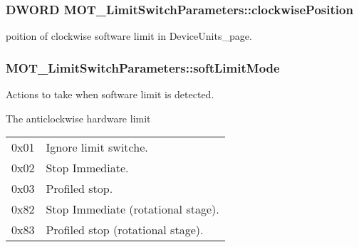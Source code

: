 \subsubsection[{\texorpdfstring{clockwise\+Position}{clockwisePosition}}]{\setlength{\rightskip}{0pt plus 5cm}D\+W\+O\+RD M\+O\+T\+\_\+\+Limit\+Switch\+Parameters\+::clockwise\+Position}\hypertarget{struct_m_o_t___limit_switch_parameters_a391960e2ffe9ba412627311342e12fbd}{}\label{struct_m_o_t___limit_switch_parameters_a391960e2ffe9ba412627311342e12fbd}


poition of clockwise software limit in Device\+Units\+\_\+page. 

\subsubsection[{\texorpdfstring{soft\+Limit\+Mode}{softLimitMode}}]{ M\+O\+T\+\_\+\+Limit\+Switch\+Parameters\+::soft\+Limit\+Mode}\hypertarget{struct_m_o_t___limit_switch_parameters_a6f99c8d8e7f41502b437867caf046c5d}{}\label{struct_m_o_t___limit_switch_parameters_a6f99c8d8e7f41502b437867caf046c5d}


Actions to take when software limit is detected. 

The anticlockwise hardware limit \tabulinesep=1mm
\begin{longtabu} spread 0pt [c]{*2{|X[-1]}|}
\hline
0x01&Ignore limit switche. \\
0x02&Stop Immediate. \\
0x03&Profiled stop. \\
0x82&Stop Immediate (rotational stage). \\
0x83&Profiled stop (rotational stage). \\
\end{longtabu}


